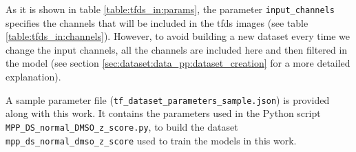 As it is shown in table \ref{table:tfds_in:params}, the parameter \texttt{input\_channels} specifies the channels that will be included in the \gls{tfds} images (see table \ref{table:tfds_in:channels}). However, to avoid building a new dataset every time we change the input channels, all the channels are included here and then filtered in the model (see section \ref{sec:dataset:data_pp:dataset_creation} for a more detailed explanation).

A sample parameter file (\texttt{tf\_dataset\_parameters\_sample.json}) is provided along with this work. It contains the parameters used in the Python script \\ \texttt{MPP\_DS\_normal\_DMSO\_z\_score.py}, to build the dataset \\ \texttt{mpp\_ds\_normal\_dmso\_z\_score} used to train the models in this work.

